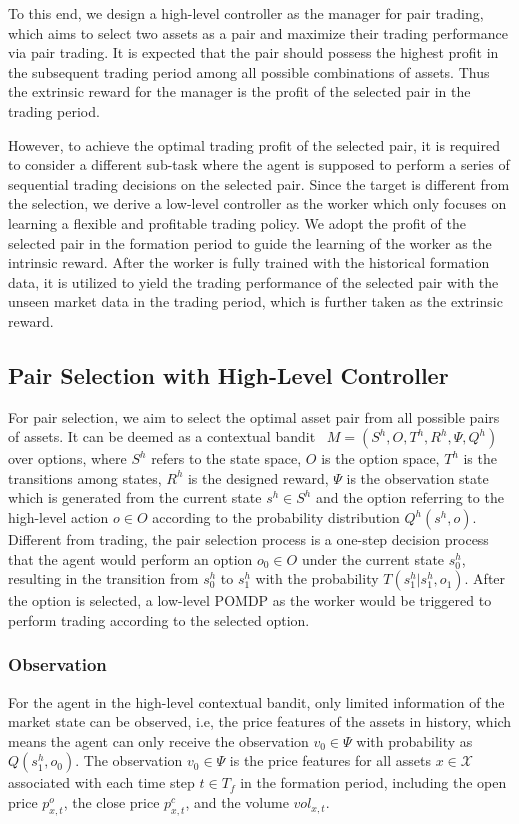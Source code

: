 \documentclass[sigconf]{acmart}
\begin{document}
To this end, we design a high-level controller as the manager for pair trading, which aims to select two assets as a pair and maximize their trading performance via pair trading.
It is expected that the pair should possess the highest profit in the subsequent trading period among all possible combinations of assets.
Thus the extrinsic reward for the manager is the profit of the selected pair in the trading period.

However, to achieve the optimal trading profit of the selected pair, it is required to consider a different sub-task where the agent is supposed to perform a series of sequential trading decisions on the selected pair.
Since the target is different from the selection, we derive a low-level controller as the worker which only focuses on learning a flexible and profitable trading policy.
We adopt the profit of the selected pair in the formation period to guide the learning of the worker as the intrinsic reward.
After the worker is fully trained with the historical formation data, it is utilized to yield the trading performance of the selected pair with the unseen market data in the trading period, which is further taken as the extrinsic reward.


\subsection{Pair Selection with High-Level Controller}
For pair selection, we aim to select the optimal asset pair from all possible pairs of assets. It can be deemed as a contextual bandit~\cite{Langford2007TheEA} $M = (S^h, O, T^h, R^h, \Psi, Q^h)$ over options, where $S^h$ refers to the state space, $O$ is the option space, $T^h$ is the transitions among states, $R^h$ is the designed reward, $\Psi$ is the observation state which is generated from the current state $s^h \in S^h$ and the option referring to the high-level action $o \in O$ according to the probability distribution $Q^h(s^h, o)$.
Different from trading, the pair selection process is a one-step decision process that the agent would perform an option $o_0 \in O$ under the current state $s^h_0$, resulting in the transition from $s^h_0$ to $s^h_1$ with the probability $T(s^h_1|s^h_1, o_1)$.
After the option is selected, a low-level POMDP as the worker would be triggered to perform trading according to the selected option.

\subsubsection{Observation}
For the agent in the high-level contextual bandit, only limited information of the market state can be observed, i.e, the price features of the assets in history, which means the agent can only receive the observation $v_0 \in \Psi$ with probability as $Q(s^h_1, o_0)$.
The observation $v_0 \in \Psi$ is the price features for all assets $x \in \mathcal{X}$ associated with each time step $t \in T_f$ in the formation period, including the open price $p^o_{x,t}$, the close price $p^c_{x,t}$, and the volume $vol_{x,t}$.
\end{document}
